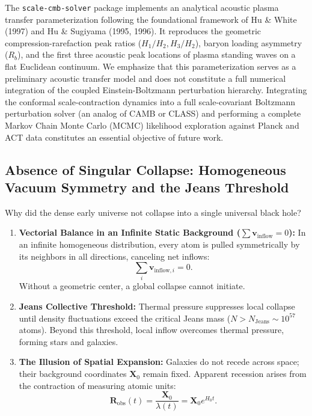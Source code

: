 \begin{remark}
    \label{rem:boltzmann_entegrasyonu}
    The \texttt{scale-cmb-solver} package implements an analytical acoustic plasma transfer parameterization following the foundational framework of Hu \& White (1997) and Hu \& Sugiyama (1995, 1996). It reproduces the geometric compression-rarefaction peak ratios ($H_1/H_2, H_3/H_2$), baryon loading asymmetry ($R_b$), and the first three acoustic peak locations of plasma standing waves on a flat Euclidean continuum. We emphasize that this parameterization serves as a preliminary acoustic transfer model and does not constitute a full numerical integration of the coupled Einstein-Boltzmann perturbation hierarchy. Integrating the conformal scale-contraction dynamics into a full scale-covariant Boltzmann perturbation solver (an analog of CAMB or CLASS) and performing a complete Markov Chain Monte Carlo (MCMC) likelihood exploration against Planck and ACT data constitutes an essential objective of future work.
\end{remark}

\subsection{Absence of Singular Collapse: Homogeneous Vacuum Symmetry and the Jeans Threshold}
\label{sec:tekil_cokus_onlenmesi}

Why did the dense early universe not collapse into a single universal black hole?
\begin{enumerate}
    \item \textbf{Vectorial Balance in an Infinite Static Background ($\sum \mathbf{v}_{\mathrm{inflow}} = 0$):}
          In an infinite homogeneous distribution, every atom is pulled symmetrically by its neighbors in all directions, canceling net inflows:
          \begin{equation}
              \sum_{i} \mathbf{v}_{\mathrm{inflow}, i} = 0.
              \label{eq:vektorel_denge}
          \end{equation}
          Without a geometric center, a global collapse cannot initiate.
    \item \textbf{Jeans Collective Threshold:}
          Thermal pressure suppresses local collapse until density fluctuations exceed the critical Jeans mass ($N > N_{\mathrm{Jeans}} \sim 10^{57}$ atoms). Beyond this threshold, local inflow overcomes thermal pressure, forming stars and galaxies.
    \item \textbf{The Illusion of Spatial Expansion:}
          Galaxies do not recede across space; their background coordinates $\mathbf{X}_0$ remain fixed. Apparent recession arises from the contraction of measuring atomic units:
          \begin{equation}
              \mathbf{R}_{\mathrm{obs}}(t) = \frac{\mathbf{X}_0}{\lambda(t)} = \mathbf{X}_0 e^{H_0 t}.
          \end{equation}
\end{enumerate}
